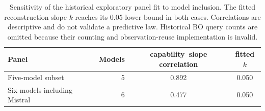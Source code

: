 \begin{table}[t]\centering
\small
\setlength{\tabcolsep}{3.5pt}
\caption{Sensitivity of the historical exploratory panel fit to model inclusion. The fitted reconstruction slope $k$ reaches its 0.05 lower bound in both cases. Correlations are descriptive and do not validate a predictive law. Historical BO query counts are omitted because their counting and observation-reuse implementation is invalid.}
\label{tab:panel}
\begin{tabular}{l r cc}\toprule
Panel & Models & capability--slope correlation & fitted $k$ \\\midrule
Five-model subset & 5 & 0.892 & 0.050 \\
Six models including Mistral & 6 & 0.477 & 0.050 \\
\bottomrule\end{tabular}\end{table}
